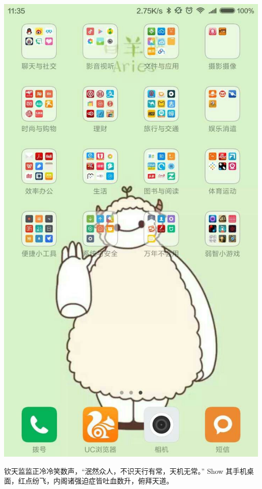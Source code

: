 \documentclass[12pt, a4paper]{book}
\begin{document}
\begin{CJK}{UTF8}{gbsn}
    \includegraphics[height=0.3\textheight]{./figure/desktop-4.jpg}

    钦天监监正冷冷笑数声，“泯然众人，不识天行有常，天机无常。” Show 其手机桌面，红点纷飞，内阁诸强迫症皆吐血数升，俯拜天道。


\end{CJK}
\end{document}
